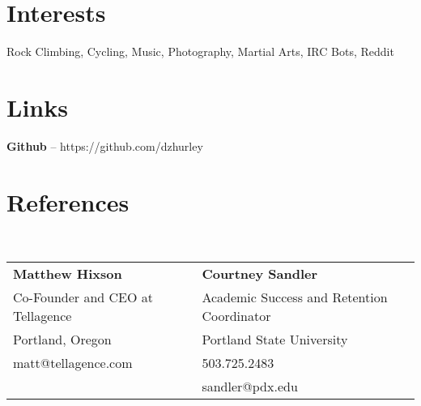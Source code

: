 \documentclass[margin,line]{resume}
\begin{document}
\begin{resume}
    \section{\mysidestyle Interests}

    Rock Climbing, Cycling, Music, Photography, Martial Arts, IRC Bots, Reddit

    \section{\mysidestyle Links}

    \textbf{Github} -- https://github.com/dzhurley

    \section{\mysidestyle References}

    \vspace{1mm}\\
    \begin{tabular}{@{}ll}
        \textbf{Matthew Hixson}           &  \textbf{Courtney Sandler}                   \\
        Co-Founder and CEO at Tellagence  &  Academic Success and Retention Coordinator  \\
        Portland, Oregon                  &  Portland State University                   \\
        matt@tellagence.com               &  503.725.2483                                \\
                                          &  sandler@pdx.edu                             \\
    \end{tabular}

\end{resume}
\end{document}
